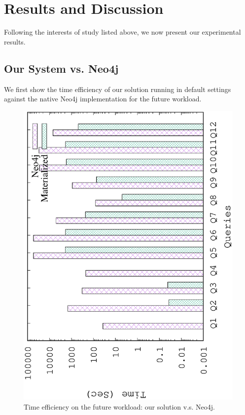 
\section{Results and Discussion}
\label{Results and Discussion}
Following the interests of study listed above, we now present our experimental results. 

\subsection{Our System vs. Neo4j}
\label{Our System vs. Neo4j}
We first show the time efficiency of our solution running in default settings against the native Neo4j implementation for the future workload.


\begin{figure}[H]
	\centering
	\includegraphics[scale=0.5, angle=270]{plot/neo4j}
	\caption{Time efficiency on the future workload: our solution v.s. Neo4j.}
	\label{fig:neo4j}
\end{figure}

